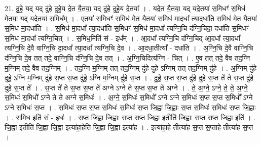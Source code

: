 \documentclass[17pt]{extarticle}
\begin{document}
21. दु॒हे॒ यद् यद् दु॑हे दुहे॒य दे॒त यै॒तया॒ यद् दु॑हे दुहे॒य दे॒तया᳚ । . यदे॒त यै॒तया॒ यद् यदे॒तया॑ स॒मिधꣳ॑ स॒मिध॑ मे॒तया॒ यद् यदे॒तया॑ स॒मिध᳚म् । . ए॒तया॑ स॒मिधꣳ॑ स॒मिध॑ मे॒त यै॒तया॑ स॒मिध॑ मा॒दधा᳚ त्या॒दधा॑ति स॒मिध॑ मे॒त यै॒तया॑ स॒मिध॑ मा॒दधा॑ति । . स॒मिध॑ मा॒दधा᳚ त्या॒दधा॑ति स॒मिधꣳ॑ स॒मिध॑ मा॒दधा᳚ त्यग्नि॒चि द॑ग्नि॒चिदा॒ दधा॑ति स॒मिधꣳ॑ स॒मिध॑ मा॒दधा᳚ त्यग्नि॒चित् । . स॒मिध॒मिति॑ सं - इध᳚म् । . आ॒दधा᳚ त्यग्नि॒चि द॑ग्नि॒चिद् आ॒दधा᳚ त्या॒दधा᳚ त्यग्नि॒चि दे॒वै वाग्नि॒चि दा॒दधा᳚ त्या॒दधा᳚ त्यग्नि॒चि दे॒व । . आ॒दधा॒तीत्या᳚ - दधा॑ति । . अ॒ग्नि॒चि दे॒वै वाग्नि॒चि द॑ग्नि॒चि दे॒व तत् तदे॒ वाग्नि॒चि द॑ग्नि॒चि दे॒व तत् । . अ॒ग्नि॒चिदित्य॑ग्नि - चित् । . ए॒व तत् तदे॒ वैव तद॒ग्नि म॒ग्निम् तदे॒ वैव तद॒ग्निम् । . तद॒ग्नि म॒ग्निम् तत् तद॒ग्निम् दु॑हे दुहे॒ ऽग्निम् तत् तद॒ग्निम् दु॑हे । . अ॒ग्निम् दु॑हे दुहे॒ ऽग्नि म॒ग्निम् दु॑हे स॒प्त स॒प्त दु॑हे॒ ऽग्नि म॒ग्निम् दु॑हे स॒प्त । . दु॒हे॒ स॒प्त स॒प्त दु॑हे दुहे स॒प्त ते॑ ते स॒प्त दु॑हे दुहे स॒प्त ते᳚ । . स॒प्त ते॑ ते स॒प्त स॒प्त ते॑ अग्ने ऽग्ने ते स॒प्त स॒प्त ते॑ अग्ने । . ते॒ अ॒ग्ने॒ ऽग्ने॒ ते॒ ते॒ अ॒ग्ने॒ स॒मिधः॑ स॒मिधो᳚ ऽग्ने ते ते अग्ने स॒मिधः॑ । . अ॒ग्ने॒ स॒मिधः॑ स॒मिधो᳚ ऽग्ने ऽग्ने स॒मिधः॑ स॒प्त स॒प्त स॒मिधो᳚ ऽग्ने ऽग्ने स॒मिधः॑ स॒प्त । . स॒मिधः॑ स॒प्त स॒प्त स॒मिधः॑ स॒मिधः॑ स॒प्त जि॒ह्वा जि॒ह्वाः स॒प्त स॒मिधः॑ स॒मिधः॑ स॒प्त जि॒ह्वाः । . स॒मिध॒ इति॑ सं - इधः॑ । . स॒प्त जि॒ह्वा जि॒ह्वाः स॒प्त स॒प्त जि॒ह्वा इतीति॑ जि॒ह्वाः स॒प्त स॒प्त जि॒ह्वा इति॑ । . जि॒ह्वा इतीति॑ जि॒ह्वा जि॒ह्वा इत्या॑हा॒हेति॑ जि॒ह्वा जि॒ह्वा इत्या॑ह । . इत्या॑हा॒हे तीत्या॑ह स॒प्त स॒प्ताहे तीत्या॑ह स॒प्त । \newline
\end{document}
